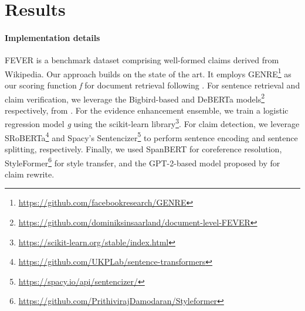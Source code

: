 \section{Results}
\paragraph{Implementation details} FEVER \cite{fever} is a benchmark dataset comprising well-formed claims derived from Wikipedia. Our approach builds on the state of the art. It employs GENRE\footnote{\url{https://github.com/facebookresearch/GENRE}} \cite{genre} as our scoring function  \textit{f} for document retrieval following \citet{genre-sota}. For sentence retrieval and claim verification, we leverage the Bigbird-based \cite{bigbird} and DeBERTa \cite{deberta} models\footnote{\url{https://github.com/dominiksinsaarland/document-level-FEVER}} respectively, from \citet{stammbach}. For the evidence enhancement ensemble, we train a logistic regression model \textit{g} using the scikit-learn library\footnote{\url{https://scikit-learn.org/stable/index.html}}. For claim detection, we leverage SRoBERTa\footnote{\url{https://github.com/UKPLab/sentence-transformers}} and Spacy's Sentencizer\footnote{\url{https://spacy.io/api/sentencizer/}} to perform sentence encoding and sentence splitting, respectively. Finally, %
we used SpanBERT \citep{spanbert} for coreference resolution, StyleFormer\footnote{
\url{https://github.com/PrithivirajDamodaran/Styleformer}} for style transfer, and the %
GPT-2-based model proposed by \citet{cread} for claim rewrite.

